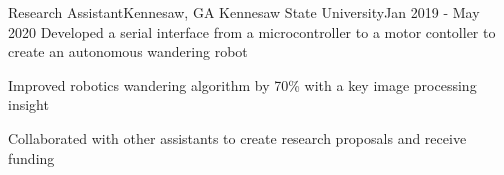 \resumeSubheading
{Research Assistant}{Kennesaw, GA}
{Kennesaw State University}{Jan 2019 - May 2020}
\resumeItemListStart
\resumeItem
{
    Developed a serial interface from a microcontroller to a motor contoller
    to create an autonomous wandering robot
}

\resumeItem
{
    Improved robotics wandering algorithm by 70\% with a key image processing insight
}

\resumeItem
{
    Collaborated with other assistants to create research proposals and receive funding
}
\resumeItemListEnd
